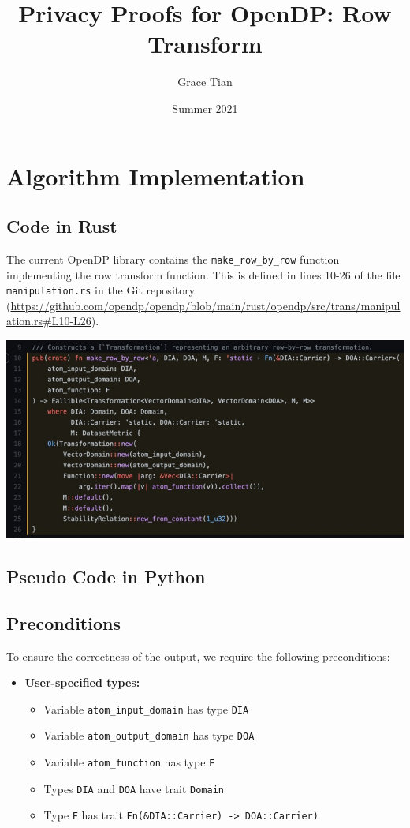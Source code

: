 \documentclass[11pt,a4paper]{article}
\title{Privacy Proofs for OpenDP: Row Transform}
\author{Grace Tian}
\date{Summer 2021}
\newcommand{\grace}[1]{{ {\color{purple}{(grace)~#1}}}}
\begin{document}
\maketitle
\tableofcontents


\section{Algorithm Implementation}
\subsection{Code in Rust}
The current OpenDP library contains the \texttt{make\_row\_by\_row} function implementing the row transform function. This is defined in lines 10-26 of the file \texttt{manipulation.rs} in the Git repository (\url{https://github.com/opendp/opendp/blob/main/rust/opendp/src/trans/manipulation.rs#L10-L26}).

\includegraphics[width=\textwidth]{make_row_by_row.jpg}


\subsection{Pseudo Code in Python} \label{sec:pseudocode}

\subsection*{Preconditions}
To ensure the correctness of the output, we require the following preconditions:

\begin{itemize}
    \item \textbf{User-specified types:}
    \begin{itemize}
        \item Variable \texttt{atom\_input\_domain} has type \texttt{DIA}
        \item Variable \texttt{atom\_output\_domain} has type \texttt{DOA}
        \item Variable \texttt{atom\_function} has type \texttt{F}
        \item Types \texttt{DIA} and \texttt{DOA} have trait \texttt{Domain}
        \item Type \texttt{F} has trait \texttt{Fn(&DIA::Carrier) -> DOA::Carrier)} \grace{Ask Mike about this.}
    \end{itemize}
\end{itemize}
\end{document}
